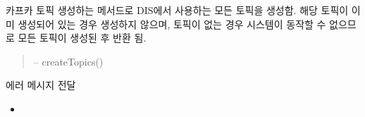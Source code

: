 \documentclass[a4paper,10pt,english]{sphinxmanual}
\begin{document}
\begin{fulllineitems}
\begin{fulllineitems}
\begin{quote}
\begin{description}
\begin{itemize}
\end{itemize}

\end{description}\end{quote}

\end{fulllineitems}


\begin{fulllineitems}
\label{\detokenize{_ctrlKafka:ctrlProducer.createCtrlTopics}}
\pysigstartsignatures
{}
\pysigstopsignatures
\sphinxAtStartPar
카프카 토픽 생성하는 메서드로 DIS에서 사용하는 모든 토픽을 생성함.
해당 토픽이 이미 생성되어 있는 경우 생성하지 않으며,
토픽이 없는 경우 시스템이 동작할 수 없으므로 모든 토픽이 생성된 후 반환 됨.
\begin{quote}\begin{description}
\sphinxAtStartPar
{} – createTopics()

\end{description}\end{quote}

\end{fulllineitems}


\begin{fulllineitems}
\label{\detokenize{_ctrlKafka:ctrlProducer.sendError}}
\pysigstartsignatures
{}
\pysigstopsignatures
\sphinxAtStartPar
에러 메시지 전달


\nopagebreak

\begin{itemize}
\item {} 
\sphinxAtStartPar
{\hyperref[\detokenize{_ctrlKafka:ctrlProducer._produce}]{}}

\end{itemize}



\end{fulllineitems}


\end{fulllineitems}
\end{document}

